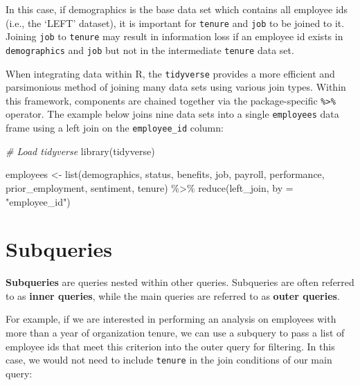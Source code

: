\documentclass[
]{book}
\newenvironment{Shaded}{\begin{snugshade}}{\end{snugshade}}
\newcommand{\AttributeTok}[1]{\textcolor[rgb]{0.77,0.63,0.00}{#1}}
\newcommand{\CommentTok}[1]{\textcolor[rgb]{0.56,0.35,0.01}{\textit{#1}}}
\newcommand{\FunctionTok}[1]{\textcolor[rgb]{0.00,0.00,0.00}{#1}}
\newcommand{\NormalTok}[1]{#1}
\newcommand{\OtherTok}[1]{\textcolor[rgb]{0.56,0.35,0.01}{#1}}
\newcommand{\SpecialCharTok}[1]{\textcolor[rgb]{0.00,0.00,0.00}{#1}}
\newcommand{\StringTok}[1]{\textcolor[rgb]{0.31,0.60,0.02}{#1}}
\begin{document}
In this case, if demographics is the base data set which contains all employee ids (i.e., the `LEFT' dataset), it is important for \texttt{tenure} and \texttt{job} to be joined to it. Joining \texttt{job} to \texttt{tenure} may result in information loss if an employee id exists in \texttt{demographics} and \texttt{job} but not in the intermediate \texttt{tenure} data set.

When integrating data within R, the \texttt{tidyverse} provides a more efficient and parsimonious method of joining many data sets using various join types. Within this framework, components are chained together via the package-specific \texttt{\%\textgreater{}\%} operator. The example below joins nine data sets into a single \texttt{employees} data frame using a left join on the \texttt{employee\_id} column:

\begin{Shaded}
\begin{Highlighting}[]
\CommentTok{\# Load tidyverse}
\FunctionTok{library}\NormalTok{(tidyverse)}

\NormalTok{employees }\OtherTok{\textless{}{-}} \FunctionTok{list}\NormalTok{(demographics,}
\NormalTok{                  status,}
\NormalTok{                  benefits,}
\NormalTok{                  job,}
\NormalTok{                  payroll,}
\NormalTok{                  performance,}
\NormalTok{                  prior\_employment,}
\NormalTok{                  sentiment,}
\NormalTok{                  tenure) }\SpecialCharTok{\%\textgreater{}\%}
                  \FunctionTok{reduce}\NormalTok{(left\_join, }\AttributeTok{by =} \StringTok{"employee\_id"}\NormalTok{)}
\end{Highlighting}
\end{Shaded}

\hypertarget{subqueries}{%
\section{Subqueries}\label{subqueries}}

\textbf{Subqueries} are queries nested within other queries. Subqueries are often referred to as \textbf{inner queries}, while the main queries are referred to as \textbf{outer queries}.

For example, if we are interested in performing an analysis on employees with more than a year of organization tenure, we can use a subquery to pass a list of employee ids that meet this criterion into the outer query for filtering. In this case, we would not need to include \texttt{tenure} in the join conditions of our main query:
\end{document}

